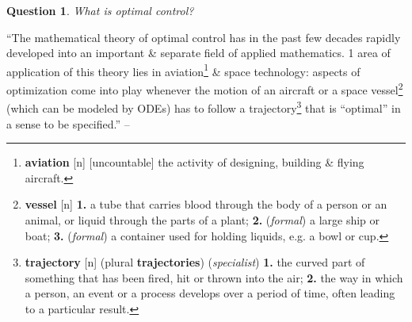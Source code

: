 \documentclass[oneside]{book}
\numberwithin{equation}{section}
\newtheorem{question}{Question}[chapter]
\begin{document}
\begin{question}
	What is optimal control?
\end{question}
``The mathematical theory of optimal control has in the past few decades rapidly developed into an important \& separate field of applied mathematics. 1 area of application of this theory lies in aviation\footnote{\textbf{aviation} [n] [uncountable] the activity of designing, building \& flying aircraft.} \& space technology: aspects of optimization come into play whenever the motion of an aircraft or a space vessel\footnote{\textbf{vessel} [n] \textbf{1.} a tube that carries blood through the body of a person or an animal, or liquid through the parts of a plant; \textbf{2.} (\textit{formal}) a large ship or boat; \textbf{3.} (\textit{formal}) a container used for holding liquids, e.g. a bowl or cup.} (which can be modeled by ODEs) has to follow a trajectory\footnote{\textbf{trajectory} [n] (plural \textbf{trajectories}) (\textit{specialist}) \textbf{1.} the curved part of something that has been fired, hit or thrown into the air; \textbf{2.} the way in which a person, an event or a process develops over a period of time, often leading to a particular result.} that is ``optimal'' in a sense to be specified.'' -- \cite[Sect. 1.1: \textit{What is optimal control?}, p. 1]{Troltzsch2010}
\end{document}

